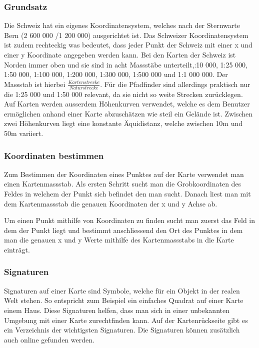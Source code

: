 \subsubsection{Grundsatz}
Die Schweiz hat ein eigenes Koordinatensystem, welches nach der Sternwarte Bern (2 600 000 /1 200 000) ausgerichtet ist. Das Schweizer Koordinatensystem ist zudem rechteckig was bedeutet, dass jeder Punkt der Schweiz mit einer x und einer y Koordinate angegeben werden kann. Bei den Karten der Schweiz ist Norden immer oben und sie sind in acht Massstäbe unterteilt,:10 000, 1:25 000, 1:50 000, 1:100 000, 1:200 000, 1:300 000, 1:500 000 und 1:1 000 000. Der Massstab ist hierbei $\frac{Kartenstrecke}{Naturstrecke}$. Für die Pfadfinder sind allerdings praktisch nur die 1:25 000 und 1:50 000 relevant, da sie nicht so weite Strecken zurücklegen. Auf Karten werden ausserdem Höhenkurven verwendet, welche es dem Benutzer ermöglichen anhand einer Karte abzuschätzen wie steil ein Gelände ist. Zwischen zwei Höhenkurven liegt eine konstante Äquidistanz, welche zwischen 10m und 50m variiert. 

\subsubsection{Koordinaten bestimmen}
Zum Bestimmen der Koordinaten eines Punktes auf der Karte verwendet man einen Kartenmassstab. Als ersten Schritt sucht man die Grobkoordinaten des Feldes in welchem der Punkt sich befindet den man sucht. Danach liest man mit dem Kartenmassstab die genauen Koordinaten der x und y Achse ab. \par Um einen Punkt mithilfe von Koordinaten zu finden sucht man zuerst das Feld in dem der Punkt liegt und bestimmt anschliessend den Ort des Punktes in dem man die genauen x und y Werte mithilfe des Kartenmassstabs in die Karte einträgt.

\subsubsection{Signaturen}

Signaturen auf einer Karte sind Symbole, welche für ein Objekt in der realen Welt stehen. So entspricht zum Beispiel ein einfaches Quadrat auf einer Karte einem Haus. Diese Signaturen helfen, dass man sich in einer unbekannten Umgebung mit einer Karte zurechtfinden kann. Auf der Kartenrückseite gibt es ein Verzeichnis der wichtigsten Signaturen. Die Signaturen können zusätzlich auch online gefunden werden\cite{oa_zeichenerklarung_nodate}.

